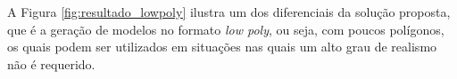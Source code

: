 \begin{figure}[h!]
	\centering
	\captionsetup{width=15cm}
	{}	
\end{figure}

\newpage

A Figura \ref{fig:resultado_lowpoly} ilustra um dos diferenciais da solução proposta, que é a geração de modelos no formato \textit{low poly}, ou seja, com poucos polígonos, os quais podem ser utilizados em situações nas quais um alto grau de realismo não é requerido.


